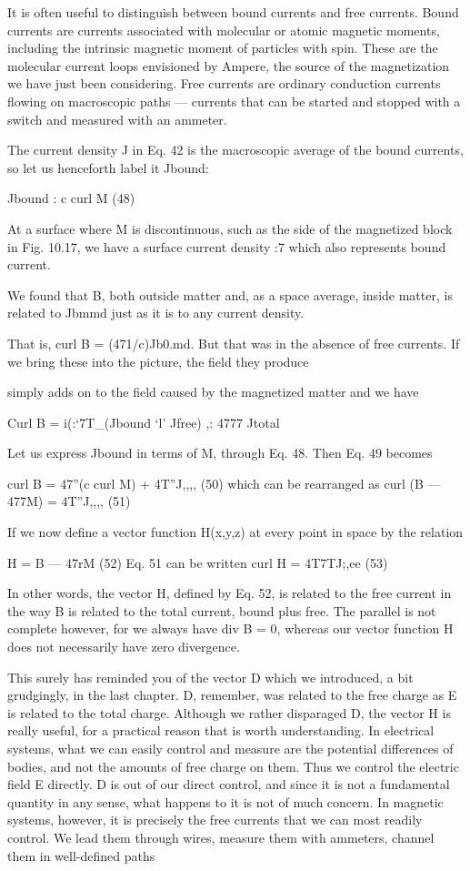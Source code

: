 {{It is often useful to distinguish between bound currents and free
currents. Bound currents are currents associated with molecular
or atomic magnetic moments, including the intrinsic magnetic
moment of particles with spin. These are the molecular current
loops envisioned by Ampere, the source of the magnetization we
have just been considering. Free currents are ordinary conduction
currents flowing on macroscopic paths --- currents that can be started
and stopped with a switch and measured with an ammeter.

The current density J in Eq. 42 is the macroscopic average of the
bound currents, so let us henceforth label it Jbound:

Jbound : c curl M (48)

At a surface where M is discontinuous, such as the side of the magnetized
block in Fig. 10.17, we have a surface current density :7 which
also represents bound current.

We found that B, both outside matter and, as a space average,
inside matter, is related to Jbmmd just as it is to any current density.

That is, curl B = (471/c)Jb0.md. But that was in the absence of free
currents. If we bring these into the picture, the field they produce

simply adds on to the field caused by the magnetized matter and
we have

Curl B = i(:‘7T_(Jbound ‘l' Jfree) ,: 4777 Jtotal 

Let us express Jbound in terms of M, through Eq. 48. Then Eq. 49
becomes

curl B = 47''(c curl M) + 4T''J,,,, (50)
which can be rearranged as
curl (B  ---  477M) = 4T''J,,,, (51)

If we now define a vector function H(x,y,z) at every point in space
by the relation

H = B  ---  47rM (52)
Eq. 51 can be written
curl H = 4T7TJ;,ee (53)

In other words, the vector H, defined by Eq. 52, is related to the
free current in the way B is related to the total current, bound plus
free. The parallel is not complete however, for we always have
div B = 0, whereas our vector function H does not necessarily have
zero divergence.

This surely has reminded you of the vector D which we introduced,
a bit grudgingly, in the last chapter. D, remember, was related to
the free charge as E is related to the total charge. Although we rather
disparaged D, the vector H is really useful, for a practical reason that
is worth understanding. In electrical systems, what we can easily
control and measure are the potential differences of bodies, and not
the amounts of free charge on them. Thus we control the electric
field E directly. D is out of our direct control, and since it is not a
fundamental quantity in any sense, what happens to it is not of much
concern. In magnetic systems, however, it is precisely the free currents
that we can most readily control. We lead them through wires,
measure them with ammeters, channel them in well-defined paths

}}

